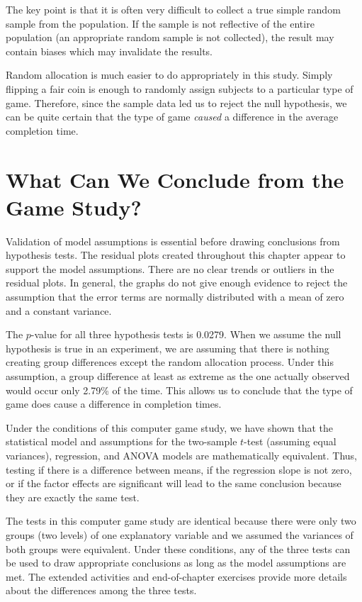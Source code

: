 \documentclass[
]{report}
\begin{document}
The key point is that it is often very difficult to collect a true simple random sample from the population. If the sample is not reflective of the entire population (an appropriate random sample is not collected), the result may contain biases which may invalidate the results.

Random allocation is much easier to do appropriately in this study. Simply flipping a fair coin is enough to randomly assign subjects to a particular type of game. Therefore, since the sample data led us to reject the null hypothesis, we can be quite certain that the type of game \emph{caused} a difference in the average completion time.

\section{\texorpdfstring{\textbf{What Can We Conclude from the Game Study?}}{What Can We Conclude from the Game Study?}}\label{what-can-we-conclude-from-the-game-study}

Validation of model assumptions is essential before drawing conclusions from hypothesis tests. The residual plots created throughout this chapter appear to support the model assumptions. There are no clear trends or outliers in the residual plots. In general, the graphs do not give enough evidence to reject the assumption that the error terms are normally distributed with a mean of zero and a constant variance.

The \(p\)-value for all three hypothesis tests is 0.0279. When we assume the null hypothesis is true in an experiment, we are assuming that there is nothing creating group differences except the random allocation process. Under this assumption, a group difference at least as extreme as the one actually observed would occur only 2.79\% of the time. This allows us to conclude that the type of game does cause a difference in completion times.

Under the conditions of this computer game study, we have shown that the statistical model and assumptions for the two-sample \(t\)-test (assuming equal variances), regression, and ANOVA models are mathematically equivalent. Thus, testing if there is a difference between means, if the regression slope is not zero, or if the factor effects are significant will lead to the same conclusion because they are exactly the same test.

The tests in this computer game study are identical because there were only two groups (two levels) of one explanatory variable and we assumed the variances of both groups were equivalent. Under these conditions, any of the three tests can be used to draw appropriate conclusions as long as the model assumptions are met. The extended activities and end-of-chapter exercises provide more details about the differences among the three tests.
\end{document}
